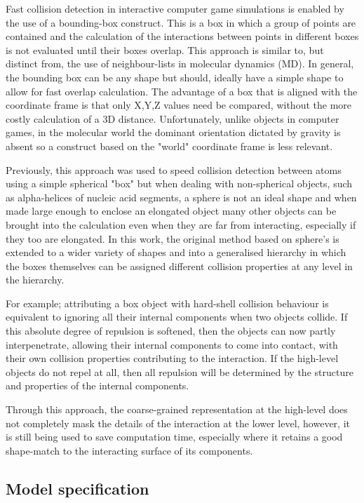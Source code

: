 Fast collision detection in interactive computer game simulations is enabled by the
use of a bounding-box construct.  This is a box in which a group of points are contained
and the calculation of the interactions between points in different boxes is not
evaluated until their boxes overlap.    This approach is similar to, but distinct from,
the use of neighbour-lists in molecular dynamics (MD).   In general, the bounding
box can be any shape but should, ideally have a simple shape to allow for fast
overlap calculation.    The advantage of a box that is aligned with the coordinate
frame is that only X,Y,Z values need be compared, without the more costly calculation
of a 3D distance. Unfortunately, unlike objects in computer games, in the molecular
world the dominant orientation dictated by gravity is absent so a construct based
on the "world" coordinate frame is less relevant.

Previously, this approach was used to speed collision detection
between atoms using a simple spherical "box" \cite{TaylorWRet10a}
but when dealing with non-spherical objects,
such as alpha-helices of nucleic acid segments, a sphere is not an ideal shape and
when made large enough to enclose an elongated object many other objects can be
brought into the calculation even when they are far from interacting, especially if
they too are elongated.   In this work, the original method based on sphere's is
extended to a wider variety of shapes and into a generalised hierarchy in which the
boxes themselves can be assigned different collision properties at any level in the
hierarchy. 

For example; attributing a box object with hard-shell collision behaviour is equivalent to
ignoring all their internal components when two objects collide.    If this absolute
degree of repulsion is softened, then the objects can now partly interpenetrate,
allowing their internal components to come into contact, with their own collision
properties contributing to the interaction.   If the high-level objects do not
repel at all, then all repulsion will be determined by the structure and properties of
the internal components.

Through this approach, the coarse-grained representation at the high-level does not
completely mask the details of the interaction at the lower level, however, it is still being
used to save computation time, especially where it retains a good shape-match to the
interacting surface of its components.


\subsection{Model specification}

